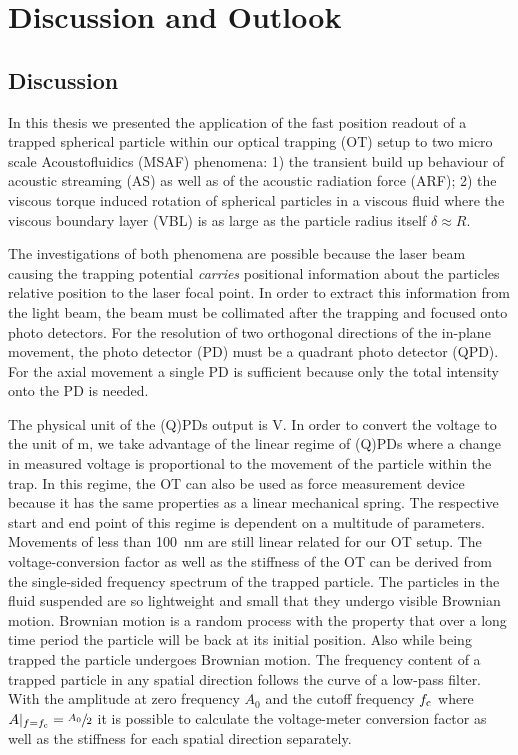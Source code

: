 \chapter[Discussion \& Outlook]{Discussion and Outlook}\label{ch:discussion}

\section{Discussion}
In this thesis we presented the application of the fast position readout of a 
trapped spherical particle within our optical trapping (OT) setup to two micro 
scale Acoustofluidics (MSAF) phenomena: 1) the transient build up behaviour of 
acoustic streaming (AS) as well as of the acoustic radiation force (ARF); 2) 
the viscous torque induced rotation of spherical particles in a viscous fluid 
where the viscous boundary layer (VBL) is as large as the particle radius 
itself $\delta \approx R$.

The investigations of both phenomena are possible because the laser beam 
causing the trapping potential \emph{carries} positional information about the 
particles relative position to the laser focal point. In order to extract this 
information from the light beam, the beam must be collimated after the trapping 
and focused onto photo detectors. For the resolution of two orthogonal 
directions of the in-plane movement, the photo detector (PD) must be a quadrant 
photo detector (QPD). For the axial movement a single PD is sufficient because 
only the total intensity onto the PD is needed.

The physical unit of the (Q)PDs output is \si{\volt}. In order to convert the 
voltage to the unit of \si{\meter}, we take advantage of the linear regime of 
(Q)PDs where a change in measured voltage is proportional to the movement of 
the particle within the trap. In this regime, the OT can also be used as force 
measurement device because it has the same properties as a linear mechanical 
spring. The respective start and end point of this regime is dependent on a 
multitude of parameters. Movements of less than \SI{100}{\nm} are still linear 
related for our OT setup. The voltage-conversion factor as well as the 
stiffness of the OT can be derived from the single-sided frequency spectrum of 
the trapped particle.  The particles in the fluid suspended are so lightweight 
and small that they undergo visible Brownian motion. Brownian motion is a 
random process with the property that over a long time period the particle will 
be back at its initial position. Also while being trapped the particle 
undergoes Brownian motion. The frequency content of a trapped particle in any 
spatial direction follows the curve of a low-pass filter. With the amplitude at 
zero frequency $A_{0}$ and the cutoff frequency $f_{\mathrm{c}}$ where 
$A\vert_{f=f_{\mathrm{c}}}=\sfrac{A_{0}}{2}$ it is possible to calculate the 
voltage-meter conversion factor as well as the stiffness for each spatial 
direction separately.

